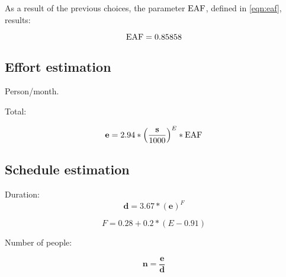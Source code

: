 As a result of the previous choices, the parameter $ \text{EAF} $, defined in \cref{eqn:eaf}, results:

\begin{equation}
	\text{EAF} = 0.85858	
\end{equation}





\subsection*{Effort estimation}

Person/month.

Total:

\begin{equation}
%
	\mEffort = 2.94 * { \left( \frac{\mSize}{1000} \right) }^{E} * \eaf
%
\end{equation}









\subsection{Schedule estimation}

Duration:\begin{equation}%
%
\mathbf{d} = 3.67 * {\left(\mathbf{e}\right)}^F
%
\end{equation}

\begin{equation}
	F = 0.28 + 0.2 * \left( E - 0.91 \right)
\end{equation}  


Number of people:

\begin{equation}
\mathbf{n} = \frac{\mathbf{e}}{\mathbf{d}}
\end{equation}











